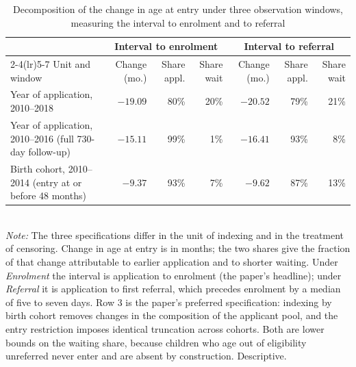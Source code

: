 \begin{table}[htbp]\centering
\caption{Decomposition of the change in age at entry under three observation windows, measuring the interval to enrolment and to referral}
\label{tab:S3windows}
\small
\setlength{\tabcolsep}{4pt}
\begin{tabular}{p{4.6cm}rrrrrr}
\toprule
 & \multicolumn{3}{c}{Interval to enrolment} & \multicolumn{3}{c}{Interval to referral} \\
\cmidrule(lr){2-4}\cmidrule(lr){5-7}
Unit and window & Change (mo.) & Share appl. & Share wait & Change (mo.) & Share appl. & Share wait \\
\midrule
Year of application, 2010--2018 & $-19.09$ & 80\% & 20\% & $-20.52$ & 79\% & 21\% \\
Year of application, 2010--2016 (full 730-day follow-up) & $-15.11$ & 99\% & 1\% & $-16.41$ & 93\% & 8\% \\
Birth cohort, 2010--2014 (entry at or before 48 months) & $-9.37$ & 93\% & 7\% & $-9.62$ & 87\% & 13\% \\
\bottomrule
\end{tabular}
\\[3pt]{\footnotesize \textit{Note:} The three specifications differ in the unit of indexing and in the treatment of censoring. Change in age at entry is in months; the two shares give the fraction of that change attributable to earlier application and to shorter waiting. Under \emph{Enrolment} the interval is application to enrolment (the paper's headline); under \emph{Referral} it is application to first referral, which precedes enrolment by a median of five to seven days. Row 3 is the paper's preferred specification: indexing by birth cohort removes changes in the composition of the applicant pool, and the entry restriction imposes identical truncation across cohorts. Both are lower bounds on the waiting share, because children who age out of eligibility unreferred never enter and are absent by construction. Descriptive.}
\end{table}
